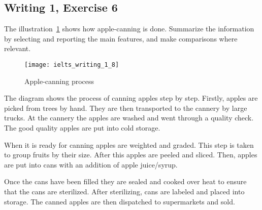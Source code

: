 \subsection*{Writing 1, Exercise 6}
The illustration~\ref{fig:ielts_writing_1_8} shows how apple-canning is done. 
Summarize the information by selecting and reporting the main features, and make comparisons where relevant.

\begin{figure}[H]
  \centering
    \texttt{[image: ielts\_writing\_1\_8]}
  \caption{Apple-canning process}
  \label{fig:ielts_writing_1_8}
\end{figure}

\begin{answer}
The diagram shows the process of canning apples step by step. 
Firstly, apples are picked from trees by hand. 
They are then transported to the cannery by large trucks. 
At the cannery the apples are washed and went through a quality check.
The good quality apples are put into cold storage.

When it is ready for canning apples are weighted and graded. 
This step is taken to group fruits by their size. 
After this apples are peeled and sliced. 
Then, apples are put into cans with an addition of apple juice/syrup.

Once the cans have been filled they are sealed and cooked over heat to ensure that the cans are sterilized. 
After sterilizing, cans are labeled and placed into storage.
The canned apples are then dispatched to supermarkets and sold.
\end{answer}
